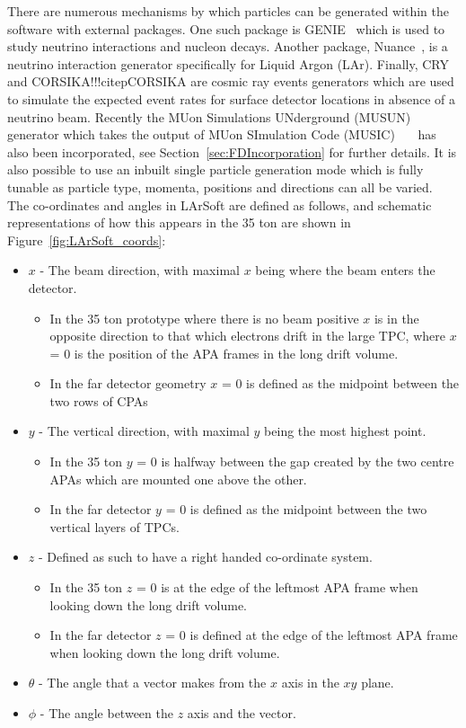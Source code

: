 There are numerous mechanisms by which particles can be generated within the software with external packages. One such package is GENIE~\citep{GENIE} which is used to study neutrino interactions and nucleon decays. Another package, Nuance~\citep{Nuance}, is a neutrino interaction generator specifically for Liquid Argon (LAr). Finally, CRY~\citep{CRY} and CORSIKA!!!citep{CORSIKA} are cosmic ray events generators which are used to simulate the expected event rates for surface detector locations in absence of a neutrino beam. Recently the MUon Simulations UNderground (MUSUN)~\citep{MUSUN}~\citep{MUSUN2} generator which takes the output of MUon SImulation Code (MUSIC)~\citep{MUSUN}~\citep{MUSIC}~\citep{MUSIC2} has also been incorporated, see Section~\ref{sec:FDIncorporation} for further details. It is also possible to use an inbuilt single particle generation mode which is fully tunable as particle type, momenta, positions and directions can all be varied. \\

The co-ordinates and angles in LArSoft are defined as follows, and schematic representations of how this appears in the 35 ton are shown in Figure~\ref{fig:LArSoft_coords}:
\begin{itemize}
\item $x$ - The beam direction, with maximal $x$ being where the beam enters the detector.
  \begin{itemize}
  \item In the 35 ton prototype where there is no beam positive $x$ is in the opposite direction to that which electrons drift in the large TPC, where $x$ = 0 is the position of the APA frames in the long drift volume.
  \item In the far detector geometry $x$ = 0 is defined as the midpoint between the two rows of CPAs 
  \end{itemize}
\item $y$ - The vertical direction, with maximal $y$ being the most highest point.
  \begin{itemize}
  \item In the 35 ton $y$ = 0 is halfway between the gap created by the two centre APAs which are mounted one above the other.
  \item In the far detector $y$ = 0 is defined as the midpoint between the two vertical layers of TPCs.
  \end {itemize}
\item $z$ - Defined as such to have a right handed co-ordinate system.
  \begin{itemize}
  \item In the 35 ton $z$ = 0 is at the edge of the leftmost APA frame when looking down the long drift volume.
  \item In the far detector $z$ = 0 is defined at the edge of the leftmost APA frame when looking down the long drift volume.
  \end{itemize}
\item $\theta$ - The angle that a vector makes from the $x$ axis in the $xy$ plane.
\item $\phi$ - The angle between the $z$ axis and the vector.
\end{itemize}

